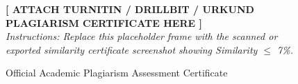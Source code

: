 \documentclass[11pt,a4paper]{article}
\begin{document}
\vspace{1.5cm}

\begin{figure}[H]
    \centering
    \begin{tcolorbox}[colback=gray!5,colframe=gray!50,title=\textbf{PLAGIARISM CHECK REPORT / CERTIFICATE ATTACHMENT}]
        \vspace{7cm}
        \centering
        \textbf{[ ATTACH TURNITIN / DRILLBIT / URKUND PLAGIARISM CERTIFICATE HERE ]}\\[8pt]
        \textit{Instructions: Replace this placeholder frame with the scanned or exported similarity certificate screenshot showing Similarity $\le$ 7\%.}
        \vspace{0.5cm}
    \end{tcolorbox}
    \caption{Official Academic Plagiarism Assessment Certificate}
    \label{fig:plagiarism_cert}
\end{figure}

\newpage
\appendix
\end{document}
